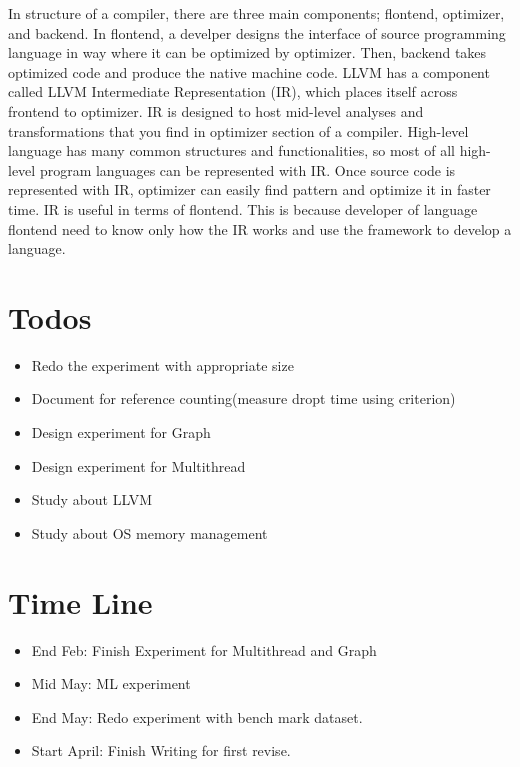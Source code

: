 In structure of a compiler, there are three main components; flontend, optimizer, and backend. 
In flontend, a develper designs the interface of source programming language in way where it can be optimized by optimizer. 
Then, backend takes optimized code and produce the native machine code. LLVM has a component called LLVM Intermediate Representation (IR), 
which places itself across frontend to optimizer. IR is designed to host mid-level analyses and transformations that you find in optimizer section of a compiler.
High-level language has many common structures and functionalities, so most of all high-level program languages can be represented with IR. 
Once source code is represented with IR, optimizer can easily find pattern and optimize it in faster time. 
IR is useful in terms of flontend. This is because developer of language flontend need to know only how the IR works and use the framework to develop a language.


\section{Todos}
\label{sec:history}
\begin{itemize}
    \item Redo the experiment with appropriate size
    \item Document for reference counting(measure dropt time using criterion)
    \item Design experiment for Graph
    \item Design experiment for Multithread
    \item Study about LLVM
    \item Study about OS memory management
\end{itemize}


\section{Time Line}
\label{sec:history}
\begin{itemize}
    \item End Feb: Finish Experiment for Multithread and Graph
    \item Mid May: ML experiment
    \item End May: Redo experiment with bench mark dataset.
    \item Start April: Finish Writing for first revise.
\end{itemize}


